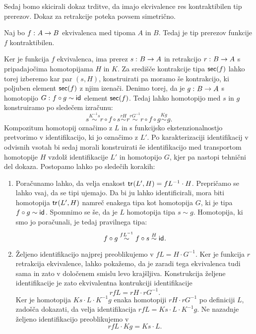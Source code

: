 Sedaj bomo skicirali dokaz trditve, da imajo ekvivalence res kontraktibilen tip prerezov. Dokaz za retrakcije poteka povsem simetrično.

\begin{trditev}
  \label{contr-sec-of-equiv}
  Naj bo \(f \,\colon A \to B\) ekvivalenca med tipoma \(A\) in \(B\). Tedaj je tip prerezov funkcije \(f\) kontraktibilen.
\end{trditev}

\begin{dokaz}
  Ker je funkcija \(f\) ekvivalenca, ima prerez \(s \,\colon B \to A\) in retrakcijo \(r \,\colon B \to A\) s pripadajočima homotopijama \(H\) in \(K\). Za središče kontrakcije tipa \(\textnormal{\textsf{sec}}(f)\) lahko torej izberemo kar par \((s, H)\), konstruirati pa moramo še kontrakcijo, ki poljuben element \(\textnormal{\textsf{sec}}(f)\) z njim izenači.
  Denimo torej, da je \(g \,\colon B \to A\) s homotopijo \(G \,\colon f \circ g \sim \textnormal{\textsf{id}}_{}\) element \(\textnormal{\textsf{sec}}(f)\). Tedaj lahko homotopijo med \(s\) in \(g\) konstruiramo po sledečem izračunu:
  \[s \overset{K^{-1}s}{\sim} r \circ f \circ s \overset{rH}{\sim}
    r \overset{rG^{-1}}{\sim} r \circ f \circ g \overset{Kg}{\sim} g.\]
  Kompozitum homotopij označimo z \(L\) in s funkcijsko ekstenzionalnostjo pretvorimo v identifikacijo, ki jo označimo z \(L'\). Po karakterizaciji identifikacij v odvisnih vsotah bi sedaj morali konstruirati še identifikacijo med transportom homotopije \(H\) vzdolž identifikacije \(L'\) in homotopijo \(G\), kjer pa nastopi tehnični del dokaza. Postopamo lahko po sledečih korakih:
  \begin{enumerate}
  \item Poračunamo lahko, da velja enakost \(\textnormal{\textsf{tr}}_{}(L', H) = fL^{-1} \cdot H\). Prepričamo se lahko vsaj, da se tipi ujemajo. Da bi ju lahko identificirali, mora biti homotopija \(\textnormal{\textsf{tr}}_{}(L', H)\) namreč enakega tipa kot homotopija \(G\), ki je tipa \(f \circ g \sim \textnormal{\textsf{id}}_{}\). Spomnimo se še, da je \(L\) homotopija tipa \(s \sim g\). Homotopija, ki smo jo poračunali, je tedaj pravilnega tipa:
    \[f \circ g \overset{fL^{-1}}{\sim} f \circ s \overset{H}{\sim} \textnormal{\textsf{id}}_{}.\]

  \item Željeno identifikacijo najprej preoblikujemo v \(fL = H \cdot G^{-1}\). Ker je funkcija \(r\) retrakcija ekvivalence, lahko pokažemo, da je zaradi tega ekvivalenca tudi sama in zato v določenem smislu levo krajšljiva. Konstrukcija željene identifikacije je zato ekvivalentna kontrukciji identifikacije \[rfL = rH \cdot rG^{-1}.\]
    Ker je homotopija \(Ks \cdot L \cdot K^{-1}g\) enaka homotopiji \(rH \cdot rG^{-1}\) po definiciji \(L\), zadošča dokazati, da velja identifikacija \(rfL = Ks \cdot L \cdot K^{-1}g.\)
    Ne nazadnje željeno identifikacijo preoblikujemo v
    \[rfL \cdot Kg = Ks \cdot L.\]


\end{enumerate}
\end{dokaz}
